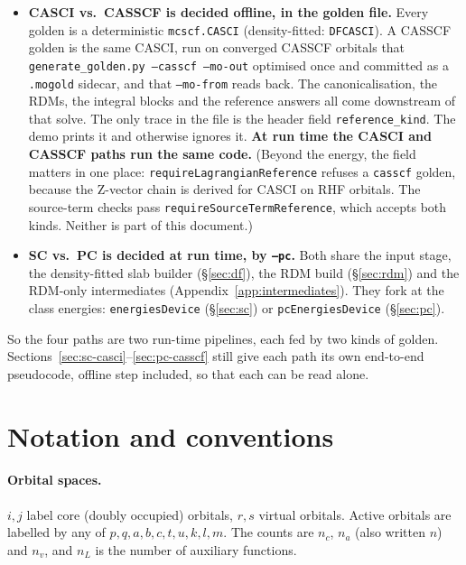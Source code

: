 \documentclass[11pt]{article}
\newcommand{\code}[1]{\texttt{#1}}
\begin{document}
\begin{itemize}
\item \textbf{CASCI vs.\ CASSCF is decided offline, in the golden file.}
  Every golden is a deterministic \code{mcscf.CASCI} (density-fitted:
  \code{DFCASCI}). A CASSCF golden is the same CASCI, run on converged
  CASSCF orbitals that \code{generate\_golden.py --casscf --mo-out}
  optimised once and committed as a \code{.mogold} sidecar, and that
  \code{--mo-from} reads back. The canonicalisation, the RDMs, the integral
  blocks and the reference answers all come downstream of that solve. The only
  trace in the file is the header field \code{reference\_kind}. The demo
  prints it and otherwise ignores it. \textbf{At run time the CASCI and
  CASSCF paths run the same code.} (Beyond the energy, the field matters in
  one place: \code{requireLagrangianReference} refuses a \code{casscf}
  golden, because the Z-vector chain is derived for CASCI on RHF orbitals.
  The source-term checks pass \code{requireSourceTermReference}, which
  accepts both kinds. Neither is part of this document.)
\item \textbf{SC vs.\ PC is decided at run time, by \code{--pc}.} Both share
  the input stage, the density-fitted slab builder (\S\ref{sec:df}), the RDM
  build (\S\ref{sec:rdm}) and the RDM-only intermediates
  (Appendix~\ref{app:intermediates}). They fork at the class energies:
  \code{energiesDevice} (\S\ref{sec:sc}) or \code{pcEnergiesDevice}
  (\S\ref{sec:pc}).
\end{itemize}

So the four paths are two run-time pipelines, each fed by two kinds of
golden. Sections~\ref{sec:sc-casci}--\ref{sec:pc-casscf} still give each path
its own end-to-end pseudocode, offline step included, so that each can be read
alone.

\section{Notation and conventions}
\label{sec:notation}

\paragraph{Orbital spaces.} $i,j$ label core (doubly occupied) orbitals,
$r,s$ virtual orbitals. Active orbitals are labelled by any of
$p,q,a,b,c,t,u,k,l,m$. The counts are $n_c$, $n_a$ (also written $n$) and
$n_v$, and $n_L$ is the number of auxiliary functions.
\end{document}
